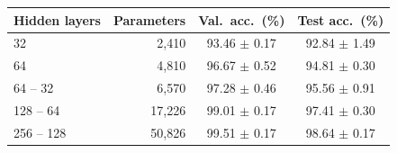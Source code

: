 \begin{tabular}{lrcc}
\toprule
Hidden layers & Parameters & Val.\ acc.\ (\%) & Test acc.\ (\%)\\
\midrule
32 & 2{,}410 & 93.46 $\pm$ 0.17 & 92.84 $\pm$ 1.49\\
64 & 4{,}810 & 96.67 $\pm$ 0.52 & 94.81 $\pm$ 0.30\\
64 -- 32 & 6{,}570 & 97.28 $\pm$ 0.46 & 95.56 $\pm$ 0.91\\
128 -- 64 & 17{,}226 & 99.01 $\pm$ 0.17 & 97.41 $\pm$ 0.30\\
256 -- 128 & 50{,}826 & 99.51 $\pm$ 0.17 & 98.64 $\pm$ 0.17\\
\bottomrule
\end{tabular}
